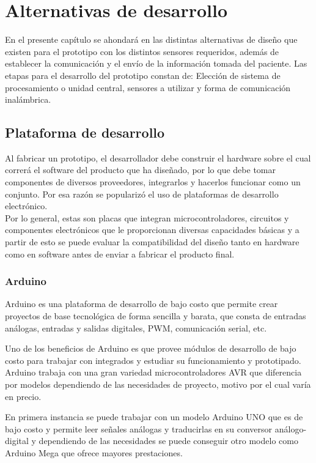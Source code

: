 \chapter{Alternativas de desarrollo}\label{alternativas}
En el presente capítulo se ahondará en las distintas alternativas de diseño que existen para el prototipo con los distintos sensores requeridos, además de establecer la comunicación y el envío de la información tomada del paciente. Las etapas para el desarrollo del prototipo constan de: Elección de sistema de procesamiento o unidad central, sensores a utilizar y forma de comunicación inalámbrica.
\section{Plataforma de desarrollo}\label{proce}
Al fabricar un prototipo, el desarrollador debe construir el hardware sobre el cual correrá el software del producto que ha diseñado, por lo que debe tomar componentes de diversos proveedores, integrarlos y hacerlos funcionar como un conjunto. Por esa razón se popularizó el uso de plataformas de desarrollo electrónico.  \\
Por lo general, estas son placas que integran microcontroladores, circuitos y componentes electrónicos que le proporcionan diversas capacidades básicas y a partir de esto se puede evaluar la compatibilidad del diseño tanto en hardware como en software antes de enviar a fabricar el producto final. 

\newpage
\subsection{Arduino}
Arduino es una plataforma de desarrollo de bajo costo que permite crear proyectos de base tecnológica de forma sencilla y barata, que consta de entradas análogas, entradas y salidas digitales, PWM, comunicación serial, etc. 

Uno de los beneficios de Arduino es que provee módulos de desarrollo de bajo costo para trabajar con integrados y estudiar su funcionamiento y prototipado.
Arduino trabaja con una gran variedad microcontroladores AVR que diferencia por modelos dependiendo de las necesidades de proyecto, motivo por el cual varía en precio. 

En primera instancia se puede trabajar con un modelo Arduino UNO que es de bajo costo y permite leer señales análogas y traducirlas en su conversor análogo-digital y dependiendo de las necesidades se puede conseguir otro modelo como Arduino Mega que ofrece mayores prestaciones. 
